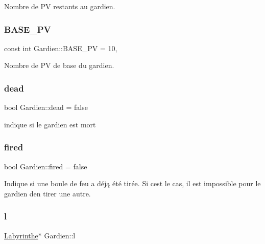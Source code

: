 Nombre de PV restants au gardien. 

\mbox{\label{classGardien_a1832c02b32c6e47b240536fd6ba47812}} 
\subsubsection{\texorpdfstring{B\+A\+S\+E\+\_\+\+PV}{BASE\_PV}}
{\footnotesize\ttfamily const int Gardien\+::\+B\+A\+S\+E\+\_\+\+PV = 10\hspace{0.3cm}{\ttfamily [static]}, {\ttfamily [private]}}



Nombre de PV de base du gardien. 

\mbox{\label{classGardien_ad418641d97373fb9304fc76f78c817ac}} 
\subsubsection{\texorpdfstring{dead}{dead}}
{\footnotesize\ttfamily bool Gardien\+::dead = false\hspace{0.3cm}{\ttfamily [private]}}



indique si le gardien est mort 

\mbox{\label{classGardien_a8ca3f9b553e9248f36735dde604fd756}} 
\subsubsection{\texorpdfstring{fired}{fired}}
{\footnotesize\ttfamily bool Gardien\+::fired = false\hspace{0.3cm}{\ttfamily [private]}}



Indique si une boule de feu a déją été tirée. Si c\textquotesingle{}est le cas, il est impossible pour le gardien d\textquotesingle{}en tirer une autre. 

\mbox{\label{classGardien_a6a2c6e6cba4cf4e760ee8509d72f0f98}} 
\subsubsection{\texorpdfstring{l}{l}}
{\footnotesize\ttfamily \hyperlink{classLabyrinthe}{Labyrinthe}$\ast$ Gardien\+::l\hspace{0.3cm}{\ttfamily [private]}}



